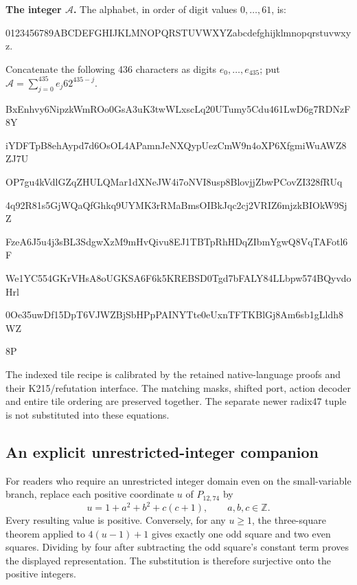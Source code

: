 \documentclass[11pt]{article}
\theoremstyle{remark}\newtheorem{remark}[theorem]{Remark}
\begin{document}
\textbf{The integer $\mathcal A$.}
The alphabet, in order of digit values $0,\ldots,61$, is:\par
{\fontsize{9}{11}\selectfont\ttfamily 0123456789ABCDEFGHIJKLMNOPQRSTUVWXYZabcdefghijklmnopqrstuvwxyz}.\par
Concatenate the following 436 characters as digits $e_0,\ldots,e_{435}$;
put $\mathcal A=\sum_{j=0}^{435}e_j62^{435-j}$.\par
\begingroup\fontsize{9}{11}\selectfont\ttfamily
BxEnhvy6NipzkWmROo0GsA3uK3twWLxscLq20UTumy5Cdu461LwD6g7RDNzF8Y\par
iYDFTpB8ehAypd7d6OsOL4APamnJeNXQypUezCmW9n4oXP6XfgmiWuAWZ8ZJ7U\par
OP7gu4kVdlGZqZHULQMar1dXNeJW4i7oNVI8usp8BlovjjZbwPCovZI328fRUq\par
4q92R81s5GjWQaQfGhkq9UYMK3rRMaBmsOIBkJqc2cj2VRIZ6mjzkBIOkW9SjZ\par
FzeA6J5u4j3sBL3SdgwXzM9mHvQivu8EJ1TBTpRhHDqZIbmYgwQ8VqTAFotl6F\par
We1YC554GKrVHsA8oUGKSA6F6k5KREBSD0Tgd7bFALY84LLbpw574BQyvdoHrl\par
0Oe35uwDf15DpT6VJWZBjSbHPpPAINYTte0eUxnTFTKBlGj8Am6sb1gLldh8WZ\par
8P\par
\endgroup


\endgroup

The indexed tile recipe is calibrated by the retained native-language
proofs and their K215/refutation interface. The matching masks, shifted
port, action decoder and entire tile ordering are preserved together.
The separate newer radix47 tuple is not substituted into these equations.

\subsection*{An explicit unrestricted-integer companion}

For readers who require an unrestricted integer domain even on the
small-variable branch, replace each positive coordinate $u$ of
$P_{12,74}$ by
\[
 u=1+a^2+b^2+c(c+1),\qquad a,b,c\in\mathbb Z.
\]
Every resulting value is positive. Conversely, for any $u\ge1$,
the three-square theorem applied to $4(u-1)+1$ gives exactly one
odd square and two even squares. Dividing by four after subtracting
the odd square's constant term proves the displayed representation.
The substitution is therefore surjective onto the positive integers.
\end{document}
